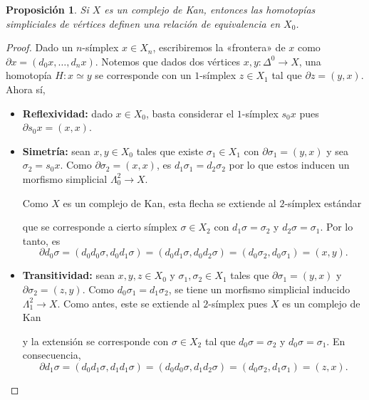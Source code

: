 \documentclass[11pt]{report}
\theoremstyle{colored}
\newtheorem{proposition}{Proposición}[section]
\renewcommand{\ss}[1]{\Delta^{#1}}
\newcommand{\horn}[2]{\Lambda^{#1}_{#2}}
\newcommand{\guill}[1]{«#1»}
\begin{document}
\begin{proposition} Si $X$ es un complejo de Kan, entonces las homotopías simpliciales de vértices definen una relación de equivalencia en $X_0$.
\end{proposition}
\begin{proof} Dado un $n$-símplex $x \in X_n$, escribiremos la \guill{frontera} de $x$ como $\partial x = (d_0x,\dots,d_nx)$. Notemos que dados dos vértices $x,y : \ss{0} \to  X$, una homotopía $H : x \simeq y$ se corresponde con un $1$-símplex $z \in X_1$ tal que $\partial z = (y,x)$. Ahora sí, 
\begin{itemize}
\item \textbf{Reflexividad:} dado $x \in X_0$, basta considerar el $1$-símplex $s_0x$ pues $\partial s_0x = (x,x)$.
\item \textbf{Simetría:} sean $x,y \in X_0$ tales que existe $\sigma_1 \in X_1$ con $\partial \sigma_1 = (y,x)$ y sea $\sigma_2 = s_0x$. Como $\partial \sigma_2 = (x,x)$, es $d_1\sigma_1 = d_2\sigma_2$ por lo que estos inducen un morfismo simplicial $\horn{2}{0} \to X$. 

Como $X$ es un complejo de Kan, esta flecha se extiende al $2$-símplex estándar 
\begin{center}
\end{center}
que se corresponde a cierto símplex $\sigma \in X_2$ con $d_1\sigma = \sigma_2$ y $d_2\sigma = \sigma_1$. Por lo tanto, es
\[
\partial d_0\sigma = (d_0d_0\sigma,d_0d_1\sigma) = (d_0d_1\sigma,d_0d_2\sigma) = (d_0\sigma_2,d_0\sigma_1) = (x,y).
\]
\item \textbf{Transitividad:} sean $x,y,z \in X_0$ y $\sigma_1,\sigma_2 \in X_1$ tales que $\partial \sigma_1 = (y,x)$ y $\partial \sigma_2 = (z,y)$. Como $d_0\sigma_1 = d_1\sigma_2$, se tiene un morfismo simplicial inducido $\horn{2}{1} \to X$. Como antes, este se extiende al $2$-símplex pues $X$ es un complejo de Kan
\begin{center}
\end{center}
y la extensión se corresponde con $\sigma \in X_2$ tal que $d_0\sigma = \sigma_2$ y $d_0\sigma = \sigma_1$. En consecuencia,
\[
\partial d_1\sigma = (d_0d_1\sigma,d_1d_1\sigma) = (d_0d_0\sigma,d_1d_2\sigma) = (d_0\sigma_2,d_1\sigma_1) = (z,x).
\]
\end{itemize}
\end{proof}
\end{document}
